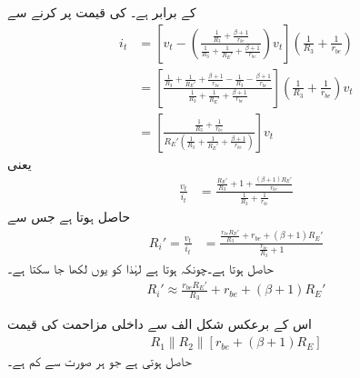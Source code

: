 کے برابر ہے۔ کی قیمت پر کرنے سے
\begin{align*}
i_t&=\left[v_t-\left(\frac{\frac{1}{R_3}+\frac{\beta+1}{r_{be}}}{\frac{1}{R_3} +\frac{1}{R_E'}+\frac{\beta+1}{r_{be}}}\right) v_t\right] \left(\frac{1}{R_3}+\frac{1}{r_{be}} \right)\\
&=\left[\frac{\frac{1}{R_3} +\frac{1}{R_E'}+\frac{\beta+1}{r_{be}}-\frac{1}{R_3}-\frac{\beta+1}{r_{be}}}{\frac{1}{R_3} +\frac{1}{R_E'}+\frac{\beta+1}{r_{be}}}\right] \left(\frac{1}{R_3}+\frac{1}{r_{be}} \right) v_t\\
&=\left[\frac{\frac{1}{R_3}+\frac{1}{r_{be}}}{R_E'\left(\frac{1}{R_3} +\frac{1}{R_E'}+\frac{\beta+1}{r_{be}} \right)}\right]  v_t
\end{align*}
یعنی
\begin{align*}
\frac{v_t}{i_t}&=\frac{\frac{R_E'}{R_3} +1+\frac{\left(\beta+1\right)R_E'}{r_{be}}}{\frac{1}{R_3}+\frac{1}{r_{be}}}
\end{align*}
حاصل ہوتا ہے جس سے
\begin{align}
R_i'=\frac{v_t}{i_t}&=\frac{\frac{r_{be} R_E'}{R_3} +r_{be}+\left(\beta+1\right)R_E' }{\frac{r_{be}}{R_3}+1}
\end{align}
حاصل ہوتا ہے۔چونکہ  ہوتا ہے لہٰذا  کو یوں لکھا جا سکتا ہے۔
\begin{align}\label{مساوات_ٹرانزسٹر_کلکٹر _مشترک_زیادہ_داخلی_مزاحمت}
R_i' \approx \frac{r_{be} R_E'}{R_3} +r_{be}+\left(\beta+1\right)R_E' 
\end{align}

اس کے برعکس شکل  الف سے  داخلی مزاحمت کی قیمت
\begin{align*}
R_1 \mathbin{\|} R_2 \mathbin{\|} \left[r_{be}+\left(\beta+1 \right) R_E\right] 
\end{align*}
حاصل ہوتی ہے جو ہر صورت  سے کم ہے۔

